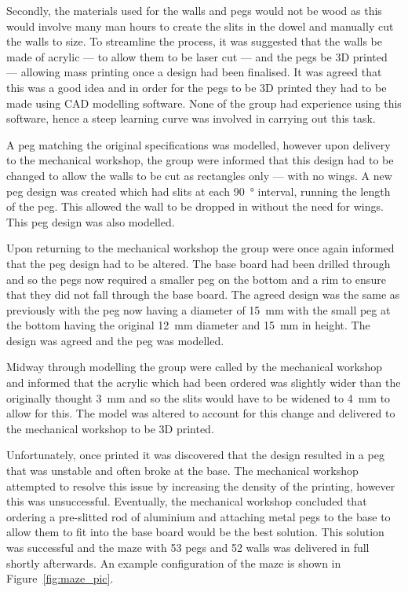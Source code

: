 Secondly, the materials used for the walls and pegs would not be wood as this
would involve many man hours to create the slits in the dowel and
manually cut the walls to size. To streamline the process, it was
suggested that the walls be made of acrylic --- to allow
them to be laser cut --- and the pegs be 3D printed --- allowing mass printing
once a design had been finalised. It was agreed that this was a good idea and
in order for the pegs to be 3D printed they had to be made using CAD modelling
software. None of the group had experience using this software, hence
a steep learning curve was involved in carrying out this task.

A peg matching the original specifications was modelled, however upon delivery
to the mechanical workshop, the group were informed that this design had to be 
changed to allow the walls to be cut as rectangles only --- with no wings. A new
peg design was created which had slits at each \SI{90}{\degree} interval,
running the length of the peg. This allowed the wall to be dropped in without
the need for wings. This peg design was also modelled.

Upon returning to the mechanical workshop the group were once again informed
that the peg design had to be altered. The base board had been drilled through
and so the pegs now required a smaller peg on the bottom and a rim to ensure
that they did not fall through the base board. The agreed design was the same as
previously with the peg now having a diameter of \SI{15}{\mm} with the small peg
at the bottom having the original \SI{12}{\mm} diameter and \SI{15}{\mm} in
height. The design was agreed and the peg was modelled.

Midway through modelling the group were called by the mechanical workshop and
informed that the acrylic which had been ordered was slightly wider than the
originally thought \SI{3}{\mm} and so the slits would have to be widened to
\SI{4}{\mm} to allow for this. The model was altered to account for this change and delivered to the mechanical workshop to be 3D printed.

Unfortunately, once printed it was discovered that the design resulted in a peg
that was unstable and often broke at the base. The mechanical workshop
attempted to resolve this issue by increasing the density of the printing,
however this was unsuccessful. Eventually, the mechanical workshop concluded
that ordering a pre-slitted rod of aluminium and attaching metal pegs to the
base to allow them to fit into the base board would be the best solution. This
solution was successful and the maze with 53 pegs and 52 walls was
delivered in full shortly afterwards. An example configuration of the maze is shown in Figure~\ref{fig:maze_pic}.

